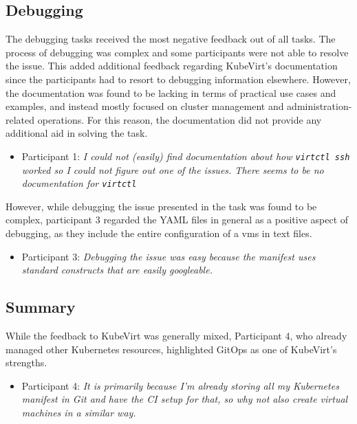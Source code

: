 \documentclass{kththesis}
\begin{document}
\begin{enumerate}
\subsection{Debugging}

The debugging tasks received the most negative feedback out of all tasks. The process of debugging was complex and some participants were not able to resolve the issue. This added additional feedback regarding KubeVirt's documentation since the participants had to resort to debugging information elsewhere. However, the documentation was found to be lacking in terms of practical use cases and examples, and instead mostly focused on cluster management and administration-related operations. For this reason, the documentation did not provide any additional aid in solving the task. 

\begin{itemize}
    \item Participant 1: \textit{I could not (easily) find documentation about how \texttt{virtctl ssh} worked so I could not figure out one of the issues. There seems to be no documentation for \texttt{virtctl}}
\end{itemize}

However, while debugging the issue presented in the task was found to be complex, participant 3 regarded the YAML files in general as a positive aspect of debugging, as they include the entire configuration of a \Glspl{vm} in text files. 

\begin{itemize}
    \item Participant 3: \textit{Debugging the issue was easy because the manifest uses standard constructs that are easily googleable.}
\end{itemize}

\subsection{Summary}
While the feedback to KubeVirt was generally mixed, Participant 4, who already managed other Kubernetes resources, highlighted GitOps as one of KubeVirt's strengths. 

\begin{itemize}
    \item Participant 4: \textit{It is primarily because I'm already storing all my Kubernetes manifest in Git and have the CI setup for that, so why not also create virtual machines in a similar way.}
\end{itemize}


\end{enumerate}
\end{document}
